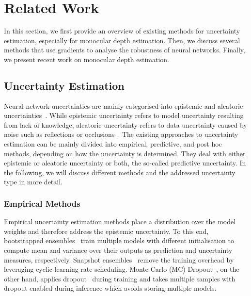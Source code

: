 \section{Related Work}
In this section, we first provide an overview of existing methods for uncertainty estimation, especially for monocular depth estimation. Then, we discuss several methods that use gradients to analyse the robustness of neural networks. Finally, we present recent work on monocular depth estimation.
\subsection{Uncertainty Estimation}
Neural network uncertainties are mainly categorised into epistemic and aleatoric uncertainties~\cite{Kendall2017WhatUD}. While epistemic uncertainty refers to model uncertainty resulting from lack of knowledge, aleatoric uncertainty refers to data uncertainty caused by noise such as reflections or occlusions~\cite{Kendall2017WhatUD}. The existing approaches to uncertainty estimation can be mainly divided into empirical, predictive, and post hoc methods, depending on how the uncertainty is determined. They deal with either epistemic or aleatoric uncertainty or both, the so-called predictive uncertainty. In the following, we will discuss different methods and the addressed uncertainty type in more detail. 
\subsubsection{Empirical Methods}
Empirical uncertainty estimation methods place a distribution over the model weights and therefore address the epistemic uncertainty. To this end, bootstrapped ensembles~\cite{Lakshminarayanan2017SimpleAS} train multiple models with different initialisation to compute mean and variance over their outputs as prediction and uncertainty measures, respectively. Snapshot ensembles~\cite{HuangSnapshot2017} remove the training overhead by leveraging cyclic learning rate scheduling. Monte Carlo (MC) Dropout~\cite{mcdropout}, on the other hand, applies dropout~\cite{dropout} during training and takes multiple samples with dropout enabled during inference which avoids storing multiple models. 
